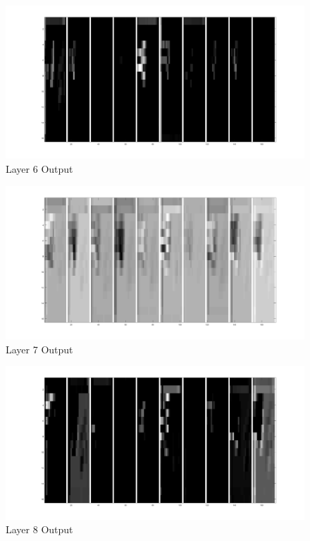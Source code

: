 \documentclass[11pt,english]{article}
\begin{document}
\begin{appendices}
\begin{figure}[h!]
  \caption{Layer 6 Output}
  \centering
    \includegraphics[width=\textwidth]{layer/6}
\end{figure}

\begin{figure}[h!]
  \caption{Layer 7 Output}
  \centering
    \includegraphics[width=\textwidth]{layer/7}
\end{figure}

\begin{figure}[h!]
  \caption{Layer 8 Output}
  \centering
    \includegraphics[width=\textwidth]{layer/8}
\end{figure}


\end{appendices}
\end{document}
